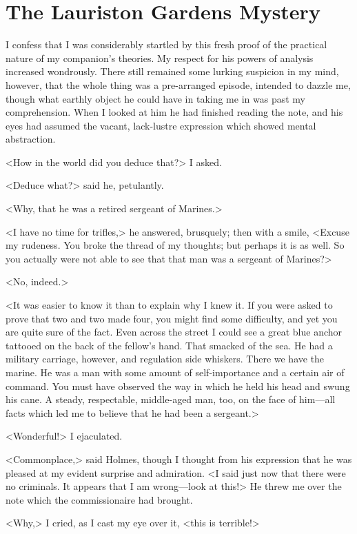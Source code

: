 \chapter{The Lauriston Gardens Mystery}
	
\lettrine{I}{} confess that I was considerably startled by this fresh proof of the practical nature of my companion's theories. My respect for his powers of analysis increased wondrously. There still remained some lurking suspicion in my mind, however, that the whole thing was a pre-arranged episode, intended to dazzle me, though what earthly object he could have in taking me in was past my comprehension. When I looked at him he had finished reading the note, and his eyes had assumed the vacant, lack-lustre expression which showed mental abstraction.

<How in the world did you deduce that?> I asked.

<Deduce what?> said he, petulantly.

<Why, that he was a retired sergeant of Marines.>

<I have no time for trifles,> he answered, brusquely; then with a smile, <Excuse my rudeness. You broke the thread of my thoughts; but perhaps it is as well. So you actually were not able to see that that man was a sergeant of Marines?>

<No, indeed.>

<It was easier to know it than to explain why I knew it. If you were asked to prove that two and two made four, you might find some difficulty, and yet you are quite sure of the fact. Even across the street I could see a great blue anchor tattooed on the back of the fellow's hand. That smacked of the sea. He had a military carriage, however, and regulation side whiskers. There we have the marine. He was a man with some amount of self-importance and a certain air of command. You must have observed the way in which he held his head and swung his cane. A steady, respectable, middle-aged man, too, on the face of him—all facts which led me to believe that he had been a sergeant.>

<Wonderful!> I ejaculated.

<Commonplace,> said Holmes, though I thought from his expression that he was pleased at my evident surprise and admiration. <I said just now that there were no criminals. It appears that I am wrong—look at this!> He threw me over the note which the commissionaire had brought.

<Why,> I cried, as I cast my eye over it, <this is terrible!>


